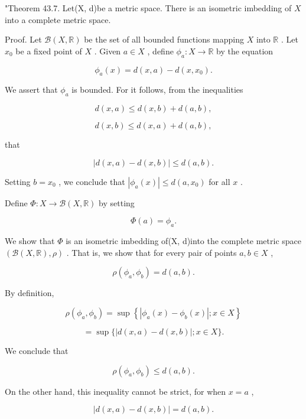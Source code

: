 "Theorem 43.7. Let(X, d)be a metric space. There is an isometric imbedding of \(X\) into a complete metric space.

Proof. Let \(\mathcal{B}\left( {X,\mathbb{R}}\right)\) be the set of all bounded functions mapping \(X\) into \(\mathbb{R}\) . Let \({x}_{0}\) be a fixed point of \(X\) . Given \(a \in  X\) , define \({\phi }_{a} : X \rightarrow  \mathbb{R}\) by the equation

\[
{\phi }_{a}\left( x\right)  = d\left( {x,a}\right)  - d\left( {x,{x}_{0}}\right) .
\]

We assert that \({\phi }_{a}\) is bounded. For it follows, from the inequalities

\[
d\left( {x,a}\right)  \leq  d\left( {x,b}\right)  + d\left( {a,b}\right) ,
\]

\[
d\left( {x,b}\right)  \leq  d\left( {x,a}\right)  + d\left( {a,b}\right) ,
\]

that

\[
\left| {d\left( {x,a}\right)  - d\left( {x,b}\right) }\right|  \leq  d\left( {a,b}\right) .
\]

Setting \(b = {x}_{0}\) , we conclude that \(\left| {{\phi }_{a}\left( x\right) }\right|  \leq  d\left( {a,{x}_{0}}\right)\) for all \(x\) .

Define \(\Phi  : X \rightarrow  \mathcal{B}\left( {X,\mathbb{R}}\right)\) by setting

\[
\Phi \left( a\right)  = {\phi }_{a}.
\]

We show that \(\Phi\) is an isometric imbedding of(X, d)into the complete metric space \(\left( {\mathcal{B}\left( {X,\mathbb{R}}\right) ,\rho }\right)\) . That is, we show that for every pair of points \(a,b \in  X\) ,

\[
\rho \left( {{\phi }_{a},{\phi }_{b}}\right)  = d\left( {a,b}\right) .
\]

By definition,

\[
\rho \left( {{\phi }_{a},{\phi }_{b}}\right)  = \sup \left\{  {\left| {{\phi }_{a}\left( x\right)  - {\phi }_{b}\left( x\right) }\right| ;x \in  X}\right\}
\]

\[
= \sup \{ \left| {d\left( {x,a}\right)  - d\left( {x,b}\right) }\right| ;x \in  X\} .
\]

We conclude that

\[
\rho \left( {{\phi }_{a},{\phi }_{b}}\right)  \leq  d\left( {a,b}\right) .
\]

On the other hand, this inequality cannot be strict, for when \(x = a\) ,

\[
\left| {d\left( {x,a}\right)  - d\left( {x,b}\right) }\right|  = d\left( {a,b}\right) .
\]

